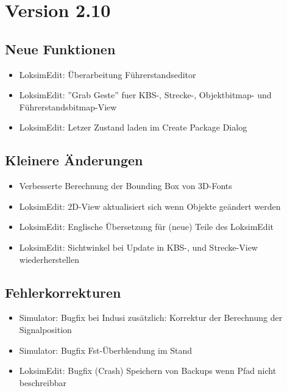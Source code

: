 \section{Version 2.10}
\subsection{Neue Funktionen}
\begin{itemize}
    \item LoksimEdit: Überarbeitung Führerstandseditor
    \item LoksimEdit: ''Grab Geste'' fuer KBS-, Strecke-, Objektbitmap- und Führerstandsbitmap-View
    \item LoksimEdit: Letzer Zustand laden im Create Package Dialog
\end{itemize}


\subsection{Kleinere Änderungen}
\begin{itemize}
    \item Verbesserte Berechnung der Bounding Box von 3D-Fonts
    \item LoksimEdit: 2D-View aktualisiert sich wenn Objekte geändert werden
    \item LoksimEdit: Englische Übersetzung für (neue) Teile des LoksimEdit
    \item LoksimEdit: Sichtwinkel bei Update in KBS-, und Strecke-View wiederherstellen
\end{itemize}

\subsection{Fehlerkorrekturen}
\begin{itemize}
    \item Simulator: Bugfix bei Indusi zusätzlich: Korrektur der Berechnung der Signalposition
    \item Simulator: Bugfix Fst-Überblendung im Stand
    \item LoksimEdit: Bugfix (Crash) Speichern von Backups wenn Pfad nicht beschreibbar
\end{itemize}
